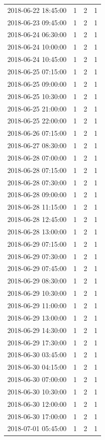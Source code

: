\begin{tabular}{lrrr}
2018-06-22 18:45:00 & 1 & 2 & 1 \\
2018-06-23 09:45:00 & 1 & 2 & 1 \\
2018-06-24 06:30:00 & 1 & 2 & 1 \\
2018-06-24 10:00:00 & 1 & 2 & 1 \\
2018-06-24 10:45:00 & 1 & 2 & 1 \\
2018-06-25 07:15:00 & 1 & 2 & 1 \\
2018-06-25 09:00:00 & 1 & 2 & 1 \\
2018-06-25 10:30:00 & 1 & 2 & 1 \\
2018-06-25 21:00:00 & 1 & 2 & 1 \\
2018-06-25 22:00:00 & 1 & 2 & 1 \\
2018-06-26 07:15:00 & 1 & 2 & 1 \\
2018-06-27 08:30:00 & 1 & 2 & 1 \\
2018-06-28 07:00:00 & 1 & 2 & 1 \\
2018-06-28 07:15:00 & 1 & 2 & 1 \\
2018-06-28 07:30:00 & 1 & 2 & 1 \\
2018-06-28 09:00:00 & 1 & 2 & 1 \\
2018-06-28 11:15:00 & 1 & 2 & 1 \\
2018-06-28 12:45:00 & 1 & 2 & 1 \\
2018-06-28 13:00:00 & 1 & 2 & 1 \\
2018-06-29 07:15:00 & 1 & 2 & 1 \\
2018-06-29 07:30:00 & 1 & 2 & 1 \\
2018-06-29 07:45:00 & 1 & 2 & 1 \\
2018-06-29 08:30:00 & 1 & 2 & 1 \\
2018-06-29 10:30:00 & 1 & 2 & 1 \\
2018-06-29 11:00:00 & 1 & 2 & 1 \\
2018-06-29 13:00:00 & 1 & 2 & 1 \\
2018-06-29 14:30:00 & 1 & 2 & 1 \\
2018-06-29 17:30:00 & 1 & 2 & 1 \\
2018-06-30 03:45:00 & 1 & 2 & 1 \\
2018-06-30 04:15:00 & 1 & 2 & 1 \\
2018-06-30 07:00:00 & 1 & 2 & 1 \\
2018-06-30 10:30:00 & 1 & 2 & 1 \\
2018-06-30 12:00:00 & 1 & 2 & 1 \\
2018-06-30 17:00:00 & 1 & 2 & 1 \\
2018-07-01 05:45:00 & 1 & 2 & 1 \\

\end{tabular}
